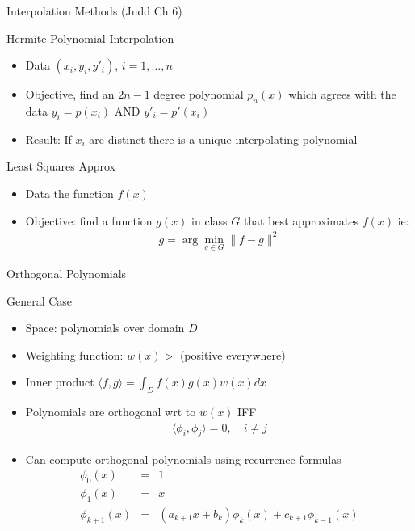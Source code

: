 \documentclass[xcolor=pdftex,dvipsnames,table,mathserif]{beamer}
\begin{document}
\begin{frame}{Interpolation Methods  (Judd Ch 6)}
\begin{block}{Hermite Polynomial Interpolation}
\begin{itemize}
\item Data $(x_i,y_i,y'_i)$, $i=1,\ldots,n$
\item Objective, find an $2n-1$ degree polynomial $p_n(x)$ which agrees with the data $y_i = p(x_i)$ AND $y'_i = p'(x_i)$
\item Result: If $x_i$ are distinct there is a unique interpolating polynomial
\end{itemize}
\end{block}
\begin{block}{Least Squares Approx}
\begin{itemize}
\item Data the function $f(x)$
\item Objective: find a function $g(x)$ in class $G$ that best approximates $f(x)$ ie:
\begin{eqnarray*}
g = \arg \min_{g \in G} \| f-g\|^2
\end{eqnarray*}
\end{itemize}
\end{block}
\end{frame}

\begin{frame}{Orthogonal Polynomials}
\begin{block}{General Case}
\begin{itemize}
\item Space: polynomials over domain $D$
\item Weighting function: $w(x) > $ (positive everywhere)
\item Inner product $\langle f,g \rangle = \int_D f(x) g(x) w(x) d x$
\item Polynomials are orthogonal wrt to $w(x)$ IFF 
\begin{eqnarray*}
\langle \phi_i, \phi_j \rangle = 0, \quad i \neq j
\end{eqnarray*}
\item Can compute orthogonal polynomials using recurrence formulas
\begin{eqnarray*}
\phi_0(x) &=& 1\\
\phi_1(x) &=& x \\
\phi_{k+1}(x) &=& (a_{k+1} x + b_k) \phi_k(x) + c_{k+1} \phi_{k-1}(x)
\end{eqnarray*}
\end{itemize}
\end{block}
\end{frame}
\end{document}
